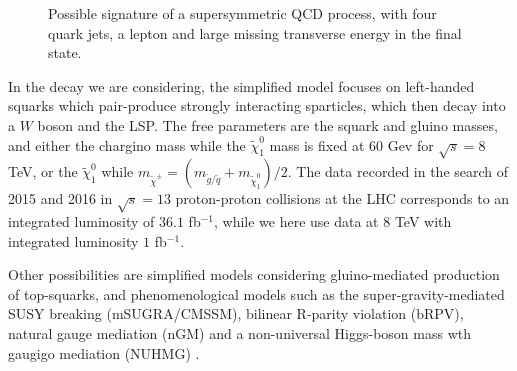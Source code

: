 \documentclass[11pt]{article}
\begin{document}
\begin{flushleft}
\begin{figure}[H]
\caption{Possible signature of a supersymmetric QCD process, with four quark jets, a lepton and large missing transverse energy in the final state.}
\label{fig:: decay at ATLAS}
\end{figure}
In the decay we are considering, the simplified model focuses on left-handed squarks which pair-produce strongly interacting sparticles, which then decay into a $W$ boson and the LSP. The free parameters are the squark and gluino masses, and either the chargino mass while the $\tilde{\chi}_1^0$ mass is fixed at $60$ Gev for $\sqrt{s}=8$ TeV, or the $\tilde{\chi}_1^0$ while $m_{\tilde{\chi}^{\pm}}=(m_{\tilde{g} / \tilde{q}}+ m_{\tilde{\chi}^0_1})/2$. The data recorded in the search of 2015 and 2016 in $\sqrt{s}=13$ proton-proton collisions at the LHC corresponds to an integrated luminosity of $36.1$ fb$^{-1}$, while we here use data at $8$ TeV with integrated luminosity $1$ fb$^{-1}$.
\end{flushleft}

\begin{flushleft}
Other possibilities are simplified models considering gluino-mediated production of top-squarks, and phenomenological models such as the super-gravity-mediated SUSY breaking (mSUGRA/CMSSM), bilinear R-parity violation (bRPV), natural gauge mediation (nGM) and a non-universal Higgs-boson mass wth gaugigo mediation (NUHMG) \cite{carquin2015search}.
\end{flushleft}
\end{document}
